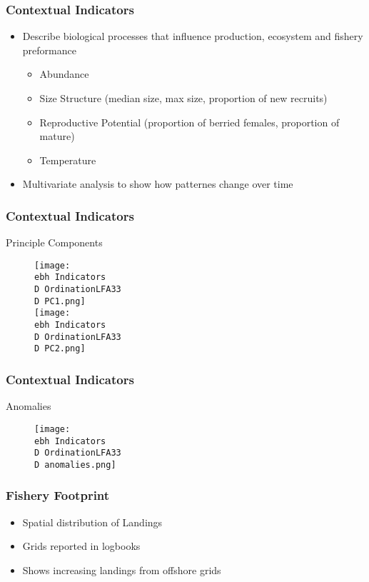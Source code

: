\documentclass{beamer}
\newcommand{\ebh}{\string~/bio.data/bio.lobster/figures/Assessment/LFA33/} %
\newcommand{\D}{.}
\begin{document}
\begin{frame}
\frametitle{Contextual Indicators}
\begin{itemize}
\item Describe biological processes that influence production, ecosystem and fishery preformance
\begin{itemize}
\item Abundance 
\item Size Structure (median size, max size, proportion of new recruits)
\item Reproductive Potential (proportion of berried females, proportion of mature)
\item Temperature 
\end{itemize}
\item Multivariate analysis to show how patternes change over time 
\end{itemize}
\end{frame}


\begin{frame}
\frametitle{Contextual Indicators}
Principle Components
\begin{figure}
        \begin{center}
            \texttt{[image: \\ebh Indicators\\D OrdinationLFA33\\D PC1.png]}\\
            \texttt{[image: \\ebh Indicators\\D OrdinationLFA33\\D PC2.png]}
        \end{center}
    \end{figure}
\end{frame}



\begin{frame}
\frametitle{Contextual Indicators}
Anomalies
\begin{figure}
        \begin{center}
            \texttt{[image: \\ebh Indicators\\D OrdinationLFA33\\D anomalies.png]}
        \end{center}
    \end{figure}
\end{frame}



\begin{frame}
\frametitle{Fishery Footprint}
\begin{itemize}
    \setlength\itemsep{2em}
\item Spatial distribution of Landings
\item Grids reported in logbooks
\item Shows increasing landings from offshore grids
\end{itemize}
\end{frame}
\end{document}
